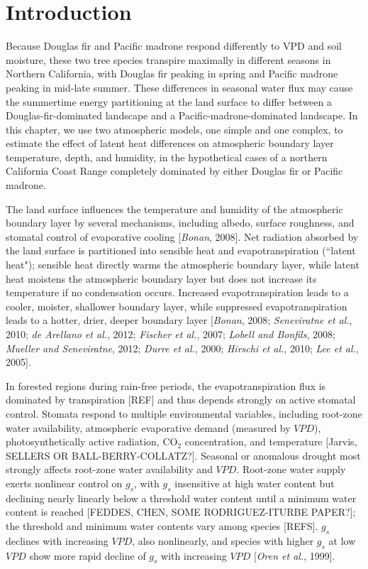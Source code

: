 \section{Introduction}

Because Douglas fir and Pacific madrone respond differently to VPD and soil moisture, these two tree species transpire maximally in different seasons in Northern California, with Douglas fir peaking in spring and Pacific madrone peaking in mid-late summer.  These differences in seasonal water flux may cause the summertime energy partitioning at the land surface to differ between a Douglas-fir-dominated landscape and a Pacific-madrone-dominated landscape.  In this chapter, we use two atmospheric models, one simple and one complex, to estimate the effect of latent heat differences on atmospheric boundary layer temperature, depth, and humidity, in the hypothetical cases of a northern California Coast Range completely dominated by either Douglas fir or Pacific madrone.

The land surface influences the temperature and humidity of the atmospheric boundary layer by several mechanisms, including albedo, surface roughness, and stomatal control of evaporative cooling [\textit{Bonan}, 2008].  Net radiation absorbed by the land surface is partitioned into sensible heat and evapotranspiration (``latent heat"); sensible heat directly warms the atmospheric boundary layer, while latent heat moistens the atmospheric boundary layer but does not increase its temperature if no condensation occurs.  Increased evapotranspiration leads to a cooler, moister, shallower boundary layer, while suppressed evapotranspiration leads to a hotter, drier, deeper boundary layer [\textit{Bonan}, 2008; \textit{Seneviratne et al.}, 2010; \textit{de Arellano et al.}, 2012; \textit{Fischer et al.}, 2007; \textit{Lobell and Bonfils}, 2008; \textit{Mueller and Seneviratne}, 2012; \textit{Durre et al.}, 2000; \textit{Hirschi et al.}, 2010; \textit{Lee et al.}, 2005].  

In forested regions during rain-free periods, the evapotranspiration flux is dominated by transpiration [REF] and thus depends strongly on active stomatal control.  Stomata respond to multiple environmental variables, including root-zone water availability, atmospheric evaporative demand (measured by $VPD$), photosynthetically active radiation, CO$_2$ concentration, and temperature [Jarvis, SELLERS OR BALL-BERRY-COLLATZ?].  Seasonal or anomalous drought most strongly affects root-zone water availability and $VPD$.  Root-zone water supply exerts nonlinear control on $g_s$, with $g_s$ insensitive at high water content but declining nearly linearly below a threshold water content until a minimum water content is reached [FEDDES, CHEN, SOME RODRIGUEZ-ITURBE PAPER?]; the threshold and minimum water contents vary among species [REFS].  $g_s$ declines with increasing $VPD$, also nonlinearly, and species with higher $g_s$ at low $VPD$ show more rapid decline of $g_s$ with increasing $VPD$ [\textit{Oren et al.}, 1999].


